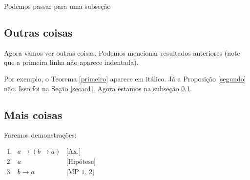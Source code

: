 \documentclass[11pt,a4paper]{article}
\begin{document}
Podemos passar para uma subse\c c\~ao

\subsection{Outras coisas} \label{subsecao}

Agora vamos ver outras coisas. Podemos mencionar resultados
anteriores (note que a primeira linha n\~ao aparece indentada).

Por exemplo, o Teorema \ref{primeiro} aparece em it\'alico. J\'a a
Proposi\c c\~ao \ref{segundo} n\~ao. Isso foi na Se\c c\~ao
\ref{secao1}. Agora estamos na subse\c c\~ao \ref{subsecao}.

\subsection{Mais coisas}

Faremos demonstra\c c\~oes:

$\begin{array}{lll} 1.& a \rightarrow (b \rightarrow a) &
\textrm{[Ax.]}\\
2.& a & \textrm{[Hip\'otese]}\\
3. & b\rightarrow a & \textrm{[MP 1, 2]}
\end{array}
$

\
\end{document}
